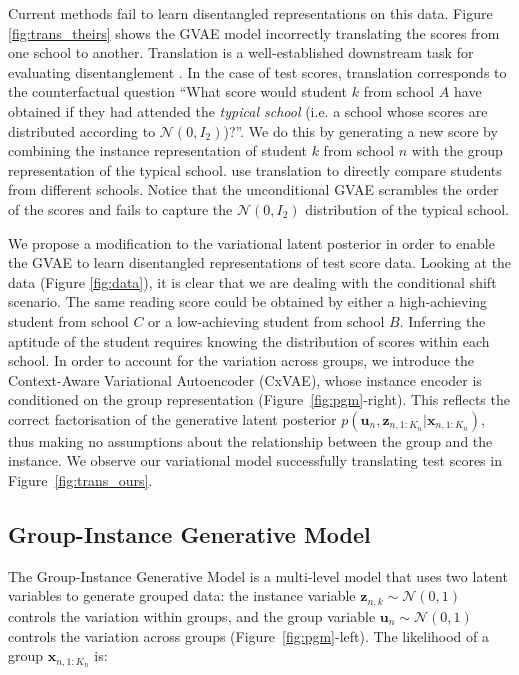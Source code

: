 \documentclass{article} %
\begin{document}
Current methods fail to learn disentangled representations on this data. Figure \ref{fig:trans_theirs} shows the GVAE model \citep{Hosoya2019GroupbasedLO} incorrectly translating the scores from one school to another. Translation is a well-established downstream task for evaluating disentanglement \citep{Tenenbaum2000SeparatingSA}. In the case of test scores, translation corresponds to the counterfactual question ``What score would student $k$ from school $A$ have obtained if they had attended the \textit{typical school} (i.e. a school whose scores are distributed according to $\mathcal{N}(0,I_2)$)?''. We do this by generating a new score by combining the instance representation of student $k$ from school $n$ with the group representation of the typical school. \citet{Raudenbush1995TheEO} use translation to directly compare students from different schools. Notice that the unconditional GVAE scrambles the order of the scores and fails to capture the $\mathcal{N}(0,I_2)$ distribution of the typical school.


We propose a modification to the variational latent posterior in order to enable the GVAE to learn disentangled representations of test score data. Looking at the data (Figure \ref{fig:data}), it is clear that we are dealing with the conditional shift scenario. The same reading score could be obtained by either a high-achieving student from school $C$ or a low-achieving student from school $B$. Inferring the aptitude of the student requires knowing the distribution of scores within each school. In order to account for the variation across groups, we introduce the Context-Aware Variational Autoencoder (CxVAE), whose instance encoder is conditioned on the group representation (Figure~\ref{fig:pgm}-right). This reflects the correct factorisation of the generative latent posterior $p(\mathbf{u}_n, \mathbf{z}_{n,1:K_n} | \mathbf{x}_{n,1:K_n})$, thus making no assumptions about the relationship between the group and the instance. We observe our variational model successfully translating test scores in Figure~\ref{fig:trans_ours}.

\subsection{Group-Instance Generative Model}

The Group-Instance Generative Model \citep{Bouchacourt2018MultiLevelVA,Hosoya2019GroupbasedLO} is a multi-level model that uses two latent variables to generate grouped data: the instance variable $\mathbf{z}_{n,k} \sim \mathcal{N} (0,1)$ controls the variation within groups, and the group variable $\mathbf{u}_n \sim \mathcal{N} (0, 1)$ controls the variation across groups (Figure~\ref{fig:pgm}-left). The likelihood of a group $\mathbf{x}_{n,1:K_n}$ is:
\end{document}
